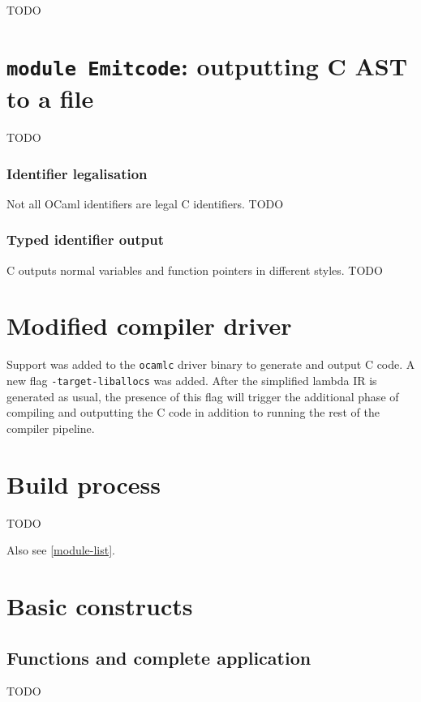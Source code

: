 \documentclass[12pt,a4paper,twoside,openright]{report}
\begin{document}
TODO

\section{\texttt{module Emitcode}: outputting C AST to a file}\label{emitcode}

TODO

\subsubsection{Identifier legalisation}

Not all OCaml identifiers are legal C identifiers. TODO

\subsubsection{Typed identifier output}

C outputs normal variables and function pointers in different styles. TODO

\section{Modified compiler driver}\label{modified-compiler-driver}

Support was added to the \lstinline!ocamlc! driver binary to generate and
output C code. A new flag \lstinline!-target-liballocs! was added. After the
simplified lambda IR is generated as usual, the presence of this flag will
trigger the additional phase of compiling and outputting the C code in addition
to running the rest of the compiler pipeline.

\section{Build process}\label{build-process}

TODO

Also see \ref{module-list}.


\section{Basic constructs}

\subsection{Functions and complete application}\label{functions}

TODO
\end{document}
